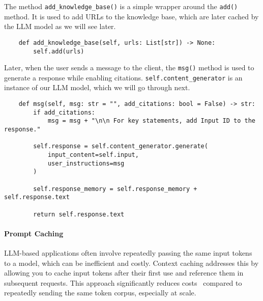 The method \texttt{add\_knowledge\_base()} is a simple wrapper around the \texttt{add()} method. It is used to add URLs to the knowledge base, which are later cached by the LLM model as we will see later.

\begin{verbatim}
    def add_knowledge_base(self, urls: List[str]) -> None:
        self.add(urls)
\end{verbatim}

Later, when the user sends a message to the client, the \texttt{msg()} method is used to generate a response while enabling citations. \texttt{self.content\_generator} is an instance of our LLM model, which we will go through next.

\begin{verbatim}
    def msg(self, msg: str = "", add_citations: bool = False) -> str:
        if add_citations:
            msg = msg + "\n\n For key statements, add Input ID to the response."

        self.response = self.content_generator.generate(
            input_content=self.input,
            user_instructions=msg
        )

        self.response_memory = self.response_memory + self.response.text

        return self.response.text
\end{verbatim}

\paragraph{Prompt Caching}

LLM-based applications often involve repeatedly passing the same input tokens to a model, which can be inefficient and costly. Context caching addresses this by allowing you to cache input tokens after their first use and reference them in subsequent requests. This approach significantly reduces costs~ compared to repeatedly sending the same token corpus, especially at scale.

